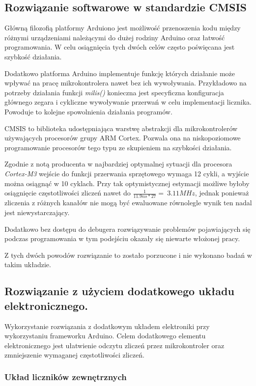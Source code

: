 \documentclass[a4paper,12pt]{article}
\begin{document}
\subsection{Rozwiązanie softwarowe w standardzie CMSIS}
Główną filozofią platformy Arduiono jest możliwość przenoszenia kodu między różnymi urządzeniami należącymi do dużej rodziny Arduino oraz łatwość programowania.
W celu osiągnięcia tych dwóch celów często poświęcana jest szybkość działania. 

Dodatkowo platforma Arduino implementuje funkcję których działanie może wpływać na pracę mikrokontrolera nawet bez ich wywoływania. 
Przykładowo na potrzeby działania funkcji \textit{milis()} konieczna jest specyficzna konfiguracja głównego zegara i cykliczne wywoływanie przerwań w celu implementacji licznika. Powoduje to kolejne spowolnienia działania programów. 


CMSIS to biblioteka udostępniająca warstwę abstrakcji dla mikrokontrolerów używających procesorów grupy ARM Cortex. 
Pozwala ona na niskopoziomowe programowanie procesorów tego typu ze skupieniem na szybkości działania.

Zgodnie z notą producenta \cite{interupt latency} w najbardziej optymalnej sytuacji dla procesora \textit{Cortex-M3} wejście do funkcji przerwania sprzętowego wymaga 12 cykli, a wyjście można osiągnąć w 10 cyklach. 
Przy tak optymistycznej estymacji możliwe byłoby osiągnięcie częstotliwości zliczeń nawet do $\frac{1}{11.9ns*27} = ~ 3.11 MHz$, jednak ponieważ zliczenia z różnych kanałów nie mogą być ewaluowane równolegle wynik ten nadal jest niewystarczający. 

Dodatkowo bez dostępu do debugera rozwiązywanie problemów pojawiających się podczas programowania w tym podejściu okazały się niewarte włożonej pracy. 

Z tych dwóch powodów rozwiązanie to zostało porzucone i nie wykonano badań w takim układzie. 

\subsection{Rozwiązanie z użyciem dodatkowego układu elektronicznego.}

Wykorzystanie rozwiązania z dodatkowym układem elektroniki przy wykorzystaniu frameworku Arduino. Celem dodatkowego elementu elektronicznego jest ułatwienie odczytu zliczeń przez mikrokontroler oraz zmniejszenie wymaganej częstotliwości zliczeń. 

\subsubsection{Układ liczników zewnętrznych}
\label{section licziki}
\end{document}

